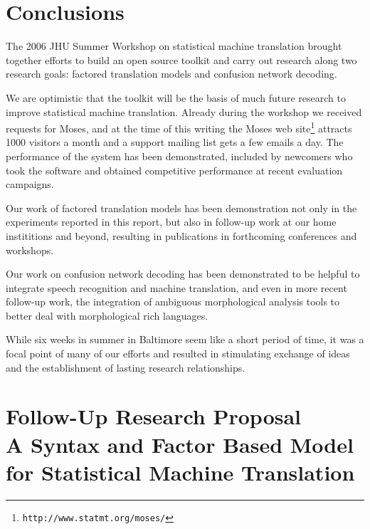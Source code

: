\documentclass[11pt]{report}
\theoremstyle{plain}
\begin{document}
{\chapter{Conclusions}
The 2006 JHU Summer Workshop on statistical machine translation brought together efforts to build an open source toolkit and carry out research along two research goals: factored translation models and confusion network decoding.

We are optimistic that the toolkit will be the basis of much future research to improve statistical machine translation. Already during the workshop we received requests for Moses, and at the time of this writing the Moses web site\footnote{\tt http://www.statmt.org/moses/} attracts 1000 visitors a month and a support mailing list gets a few emails a day. The performance of the system has been demonstrated, included by newcomers who took the software and obtained competitive performance at recent evaluation campaigns.

Our work of factored translation models has been demonstration not only in the experiments reported in this report, but also in follow-up work at our home instititions and beyond, resulting in publications in forthcoming conferences and workshops.

Our work on confusion network decoding has been demonstrated to be helpful to integrate speech recognition and machine translation, and even in more recent follow-up work, the integration of ambiguous morphological analysis tools to better deal with morphological rich languages.

While six weeks in summer in Baltimore seem like a short period of time, it was a focal point of many of our efforts and resulted in stimulating exchange of ideas and the establishment of lasting research relationships.


\appendix

\chapter{Follow-Up Research Proposal\\
A Syntax and Factor Based Model for Statistical Machine Translation}

\newcommand{\gen}{\hbox{GEN}}
\newcommand{\rep}{\bar{\phi}}
\newcommand{\Rep}{{\Phi}}
\newcommand{\reals}{\mbox{\msym R}}
\newcommand{\pav}{\bar{\alpha}}
\newcommand{\ip}[2]{{#1} \cdot {#2}}
\def\parcite#1{(\cite{#1})}
\def\perscite#1{\cite{#1}} %

}
\end{document}
